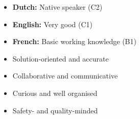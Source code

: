 \twocolumnsection
{
    \vspace{1em}
    \begin{itemize}
        \item \textbf{Dutch:} Native speaker (C2)
        \item \textbf{English:} Very good (C1)
        \item \textbf{French:} Basic working knowledge (B1)
    \end{itemize}
}
{
    \vspace{1em}
    \begin{itemize}
        \item Solution-oriented and accurate
        \item Collaborative and communicative
        \item Curious and well organised
        \item Safety- and quality-minded
    \end{itemize}}
